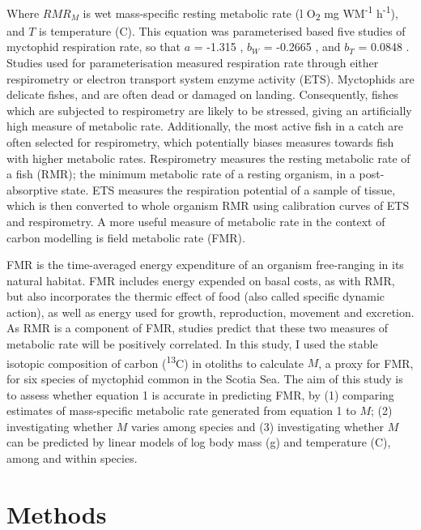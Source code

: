\documentclass[12pt, titlepage]{article}
\begin{document}
\noindent Where $RMR_{M}$ is wet mass-specific resting metabolic rate (\textmu l O\textsubscript{2} mg WM\textsuperscript{-1} h\textsuperscript{-1}), and $T$ is temperature (\textdegree C).
This equation was parameterised based five studies of myctophid respiration rate, so that $a$ = -1.315 , $b_{W}$ = -0.2665 , and $b_{T}$ = 0.0848 .
Studies used for parameterisation measured respiration rate through either respirometry or electron transport system enzyme activity (ETS). %
Myctophids are delicate fishes, and are often dead or damaged on landing.
Consequently, fishes which are subjected to respirometry are likely to be stressed, giving an artificially high measure of metabolic rate.
Additionally, the most active fish in a catch are often selected for respirometry, which potentially biases measures towards fish with higher metabolic rates. %
Respirometry measures the resting metabolic rate of a fish (RMR); the minimum metabolic rate of a resting organism, in a post-absorptive state. %
ETS measures the respiration potential of a sample of tissue, which is then converted to whole organism RMR using calibration curves of ETS and respirometry. %
A more useful measure of metabolic rate in the context of carbon modelling is field metabolic rate (FMR).

FMR is the time-averaged energy expenditure of an organism free-ranging in its natural habitat.
FMR includes energy expended on basal costs, as with RMR, but also incorporates the thermic effect of food (also called specific dynamic action), as well as energy used for growth, reproduction, movement and excretion. %
As RMR is a component of FMR, studies predict that these two measures of metabolic rate will be positively correlated. %
In this study, I used the stable isotopic composition of carbon (\textdelta \textsuperscript{13}C) in otoliths to calculate $M$, a proxy for FMR, %
for six species of myctophid common in the Scotia Sea. %
The aim of this study is to assess whether equation 1 is accurate in predicting FMR, by (1) comparing estimates of mass-specific metabolic rate generated from equation 1 to $M$; (2) investigating whether $M$ varies among species and (3) investigating whether $M$ can be predicted by linear models of log body mass (g) and temperature (\textdegree C), among and within species.

\pagebreak
\section{Methods} %
\end{document}
